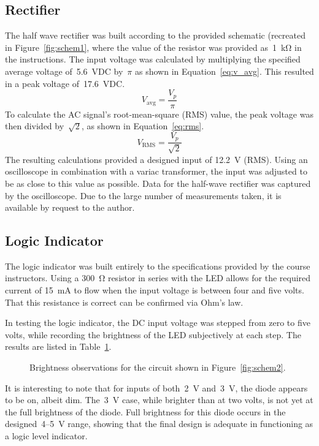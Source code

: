\subsection{Rectifier}
The half wave rectifier was built according to the provided schematic (recreated
in Figure~\ref{fig:schem1}, where the value of the resistor was provided
as~\SI{1}{\kilo\ohm} in the instructions.  The input voltage was calculated by
multiplying the specified average voltage of~\SI{5.6}{\volt}DC by~$\pi$ as
shown in Equation~\ref{eq:v_avg}.  This resulted in a peak voltage
of~\SI{17.6}{\volt}DC.
%
\begin{equation}
	V_\text{avg} = \frac{V_p}{\pi}
	\label{eq:v_avg}
\end{equation}
%
To calculate the AC signal's root-mean-square (RMS) value, the peak voltage was
then divided by~$\sqrt{2}$, as shown in Equation~\ref{eq:rms}.
%
\begin{equation}
	V_\text{RMS} = \frac{V_p}{\sqrt{2}}
	\label{eq:rms}
\end{equation}
%
The resulting calculations provided a designed input of \SI{12.2}{\volt} (RMS).
Using an oscilloscope in combination with a variac transformer, the input was
adjusted to be as close to this value as possible. Data for the half-wave
rectifier was captured by the oscilloscope.  Due to the large number of
measurements taken, it is available by request to the author.

\subsection{Logic Indicator}
The logic indicator was built entirely to the specifications provided by the
course instructors.  Using a \SI{300}{\ohm} resistor in series with the LED
allows for the required current of \SI{15}{\milli\ampere} to flow when the
input voltage is between four and five volts.  That this resistance is correct
can be confirmed via Ohm's law.

In testing the logic indicator, the DC input voltage was stepped from zero to
five volts, while recording the brightness of the LED subjectively at each
step.  The results are listed in Table~\ref{tab:ckt2data}.
%
\begin{figure}[H]
	\centering
	
	\caption{Brightness observations for the circuit shown in
		Figure~\ref{fig:schem2}.}
	\label{tab:ckt2data}
\end{figure}
%
It is interesting to note that for inputs of both~\SI{2}{\volt}
and~\SI{3}{\volt}, the diode appears to be on, albeit dim.  The~\SI{3}{\volt}
case, while brighter than at two volts, is not yet at the full brightness of
the diode.  Full brightness for this diode occurs in the
designed~4--\SI{5}{\volt} range, showing that the final design is adequate in
functioning as a logic level indicator.


